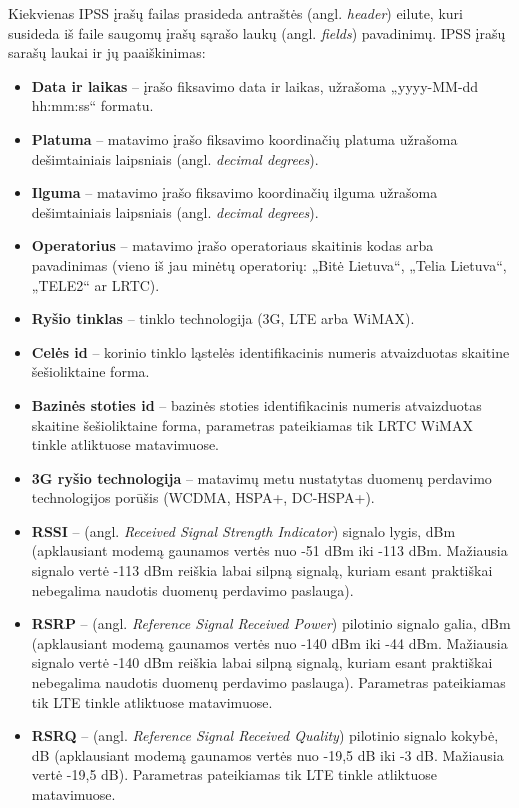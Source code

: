\documentclass{VUMIFPSbakalaurinis}
\begin{document}
Kiekvienas IPSS įrašų failas prasideda antraštės (angl. \textit{header}) eilute, kuri susideda iš faile saugomų įrašų sąrašo laukų (angl. \textit{fields}) pavadinimų. IPSS įrašų sarašų laukai ir jų paaiškinimas:

\begin{itemize}
	\item \textbf{Data ir laikas} – įrašo fiksavimo data ir laikas, užrašoma „yyyy-MM-dd hh:mm:ss“ formatu.
	\item \textbf{Platuma} – matavimo įrašo fiksavimo koordinačių platuma užrašoma dešimtainiais laipsniais (angl. \textit{decimal degrees}).
	\item \textbf{Ilguma} – matavimo įrašo fiksavimo koordinačių ilguma užrašoma dešimtainiais laipsniais (angl. \textit{decimal degrees}).
	\item \textbf{Operatorius} – matavimo įrašo operatoriaus skaitinis kodas arba pavadinimas (vieno iš jau minėtų operatorių: „Bitė Lietuva“, „Telia Lietuva“, „TELE2“ ar LRTC).
	\item \textbf{Ryšio tinklas} – tinklo technologija (3G, LTE arba WiMAX).
	\item \textbf{Celės id} – korinio tinklo ląstelės identifikacinis numeris atvaizduotas skaitine šešioliktaine forma.
	\item \textbf{Bazinės stoties id} – bazinės stoties identifikacinis numeris atvaizduotas skaitine šešioliktaine forma, parametras pateikiamas tik LRTC WiMAX tinkle atliktuose matavimuose.
	\item \textbf{3G ryšio technologija} – matavimų metu nustatytas duomenų perdavimo technologijos porūšis (WCDMA, HSPA+, DC-HSPA+).
	\item \textbf{RSSI} – (angl. \textit{Received Signal Strength Indicator}) signalo lygis, dBm (apklausiant modemą gaunamos vertės nuo -51 dBm iki -113 dBm. Mažiausia signalo vertė -113 dBm reiškia labai silpną signalą, kuriam esant praktiškai nebegalima naudotis duomenų perdavimo paslauga).
	\item \textbf{RSRP} – (angl. \textit{Reference Signal Received Power}) pilotinio signalo galia, dBm (apklausiant modemą gaunamos vertės nuo -140 dBm iki -44 dBm. Mažiausia signalo vertė -140 dBm reiškia labai silpną signalą, kuriam esant praktiškai nebegalima naudotis duomenų perdavimo paslauga). Parametras pateikiamas tik LTE tinkle atliktuose matavimuose.
	\item \textbf{RSRQ} – (angl. \textit{Reference Signal Received Quality}) pilotinio signalo kokybė, dB (apklausiant modemą gaunamos vertės nuo -19,5 dB iki -3 dB. Mažiausia vertė -19,5 dB). Parametras pateikiamas tik LTE tinkle atliktuose matavimuose.

\end{itemize}
\end{document}
